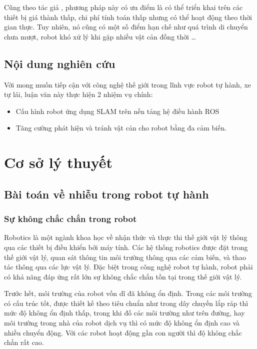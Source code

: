 Cũng theo tác giả \cite{Susnea2010}, phương pháp này có ưu điểm là có thể triển khai trên các thiết bị giá thành thấp, chi phí tính toán thấp nhưng có thể hoạt động theo thời gian thực. Tuy nhiên, nó cũng có một số điểm hạn chế như quá trình di chuyển chưa mượt, robot khó xử lý khi gặp nhiều vật cản đồng thời \dots




\section{Nội dung nghiên cứu}


Với mong muốn tiếp cận với công nghệ thế giới trong lĩnh vực robot tự hành, xe tự lái, luận văn này thực hiện 2 nhiệm vụ chính:
\begin{itemize}
  \item Cấu hình robot ứng dụng SLAM trên nền tảng hệ điều hành ROS
  \item Tăng cường phát hiện và tránh vật cản cho robot bằng đa cảm biến.
\end{itemize}

\chapter{Cơ sở lý thuyết}
\label{chap:1cslt}
\section{Bài toán về nhiễu trong robot tự hành}
\subsection{Sự không chắc chắn trong robot}
Robotics là một ngành khoa học về nhận thức và thực thi thế giới vật lý thông qua các thiết bị điều khiển bởi máy tính. Các hệ thống robotics được đặt trong thế giới vật lý, quan sát thông tin môi trường thông qua các cảm biến, và thao tác thông qua các lực vật lý. Đặc biệt trong công nghệ robot tự hành, robot phải có khả năng đáp ứng rất lớn sự không chắc chắn tồn tại trong thế giới vật lý. 

Trước hết, môi trường của robot vốn dĩ đã không ổn định. Trong các môi trường có cấu trúc tốt, được thiết kế theo tiêu chuẩn như trong dây chuyền lắp ráp thì mức độ không ổn định thấp, trong khi đố các môi trường như trên đường, hay môi trường trong nhà của robot dịch vụ thì có mức độ không ổn định cao và nhiều chuyển động. Với các robot hoạt động gần con người thì độ không chắc chắn rất cao.

